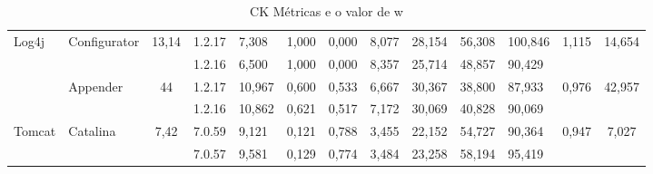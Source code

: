 \documentclass[12pt]{article}
\begin{document}
\begin{table}[h]
{\begin{tabular}{|l|l|c|l|l|l|l|l|l|l|l|c|c|}
\multirow{4}{*}{Log4j}                     & \multirow{2}{*}{Configurator}         & \multirow{2}{*}{13,14}     & 1.2.17                            & 7,308                          & 1,000                          & 0,000                          & 8,077                          & 28,154                         & 56,308                          & 100,846                         & \multirow{2}{*}{1,115} & \multirow{2}{*}{14,654} \\ \cline{4-11}
                                           &                                       &                            & 1.2.16                            & 6,500                          & 1,000                          & 0,000                          & 8,357                          & 25,714                         & 48,857                          & 90,429                          &                        &                         \\ \cline{2-13} 
                                           & \multirow{2}{*}{Appender}             & \multirow{2}{*}{44}        & 1.2.17                            & 10,967                         & 0,600                          & 0,533                          & 6,667                          & 30,367                         & 38,800                          & 87,933                          & \multirow{2}{*}{0,976} & \multirow{2}{*}{42,957} \\ \cline{4-11}
                                           &                                       &                            & 1.2.16                            & 10,862                         & 0,621                          & 0,517                          & 7,172                          & 30,069                         & 40,828                          & 90,069                          &                        &                         \\ \hline
\multirow{2}{*}{Tomcat}                    & \multirow{2}{*}{Catalina}             & \multirow{2}{*}{7,42}      & 7.0.59                            & 9,121                          & 0,121                          & 0,788                          & 3,455                          & 22,152                         & 54,727                          & 90,364                          & \multirow{2}{*}{0,947} & \multirow{2}{*}{7,027}  \\ \cline{4-11}
                                           &                                       &                            & 7.0.57                            & 9,581                          & 0,129                          & 0,774                          & 3,484                          & 23,258                         & 58,194                          & 95,419                          &                        &                         \\ \hline
\end{tabular}
}
\caption{CK Métricas e o valor de w}
\label{tab:ck_metricas}
\end{table}
\end{document}
